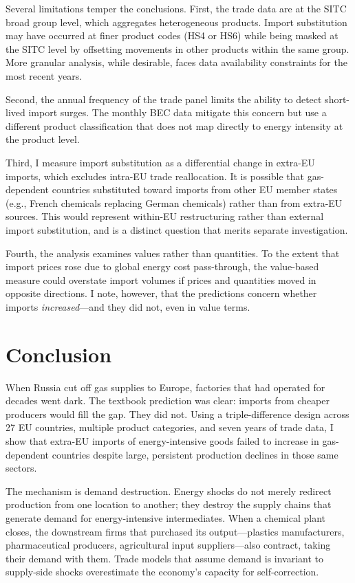 \documentclass[12pt]{article}
\begin{document}
Several limitations temper the conclusions. First, the trade data are at the SITC broad group level, which aggregates heterogeneous products. Import substitution may have occurred at finer product codes (HS4 or HS6) while being masked at the SITC level by offsetting movements in other products within the same group. More granular analysis, while desirable, faces data availability constraints for the most recent years.

Second, the annual frequency of the trade panel limits the ability to detect short-lived import surges. The monthly BEC data mitigate this concern but use a different product classification that does not map directly to energy intensity at the product level.

Third, I measure import substitution as a differential change in extra-EU imports, which excludes intra-EU trade reallocation. It is possible that gas-dependent countries substituted toward imports from other EU member states (e.g., French chemicals replacing German chemicals) rather than from extra-EU sources. This would represent within-EU restructuring rather than external import substitution, and is a distinct question that merits separate investigation.

Fourth, the analysis examines values rather than quantities. To the extent that import prices rose due to global energy cost pass-through, the value-based measure could overstate import volumes if prices and quantities moved in opposite directions. I note, however, that the predictions concern whether imports \textit{increased}---and they did not, even in value terms.


\section{Conclusion}
\label{sec:conclusion}

When Russia cut off gas supplies to Europe, factories that had operated for decades went dark. The textbook prediction was clear: imports from cheaper producers would fill the gap. They did not. Using a triple-difference design across 27 EU countries, multiple product categories, and seven years of trade data, I show that extra-EU imports of energy-intensive goods failed to increase in gas-dependent countries despite large, persistent production declines in those same sectors.

The mechanism is demand destruction. Energy shocks do not merely redirect production from one location to another; they destroy the supply chains that generate demand for energy-intensive intermediates. When a chemical plant closes, the downstream firms that purchased its output---plastics manufacturers, pharmaceutical producers, agricultural input suppliers---also contract, taking their demand with them. Trade models that assume demand is invariant to supply-side shocks overestimate the economy's capacity for self-correction.
\end{document}
